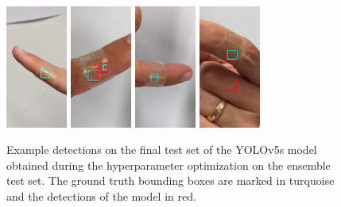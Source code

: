 \documentclass[10pt]{book}
\begin{document}
\begin{figure}
  \centering
  \includegraphics[width=0.18\textwidth]{image/final_test_example_8_preds_and_gts}
  \includegraphics[width=0.18\textwidth]{image/final_test_example_24_preds_and_gts}
  \includegraphics[width=0.18\textwidth]{image/final_test_example_27_preds_and_gts}
  \includegraphics[width=0.18\textwidth]{image/final_test_example_28_preds_and_gts}
  \caption{Example detections on the final test set of the \ac{YOLO}v5s model obtained during the hyperparameter optimization on the ensemble test set. The ground truth bounding boxes are marked in turquoise and the detections of the model in red.}
  \label{fig:final_testset_detections}
\end{figure}
\end{document}
